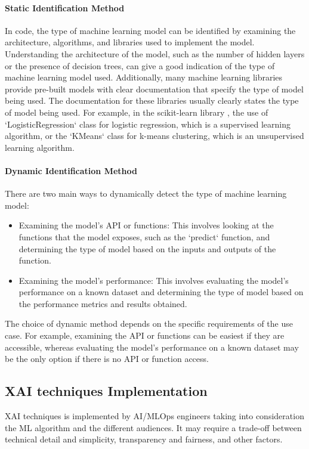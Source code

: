 \documentclass[conference]{IEEEtran}
\begin{document}
\paragraph{Static Identification Method} In code, the type of machine learning model can be identified by examining the architecture, algorithms, and libraries used to implement the model. Understanding the architecture of the model, such as the number of hidden layers or the presence of decision trees, can give a good indication of the type of machine learning model used. Additionally, many machine learning libraries provide pre-built models with clear documentation that specify the type of model being used. The documentation for these libraries usually clearly states the type of model being used. 
For example, in the scikit-learn library \cite{pedregosa2011scikit}, the use of `LogisticRegression` class for logistic regression, which is a supervised learning algorithm, or the `KMeans` class for k-means clustering, which is an unsupervised learning algorithm.
\paragraph{Dynamic Identification Method}There are two main ways to dynamically detect the type of machine learning model:

\begin{itemize}
	\item Examining the model's API or functions: This involves looking at the functions that the model exposes, such as the `predict` function, and determining the type of model based on the inputs and outputs of the function.

	\item Examining the model's performance: This involves evaluating the model's performance on a known dataset and determining the type of model based on the performance metrics and results obtained.
\end{itemize}

The choice of dynamic method depends on the specific requirements of the use case. For example, examining the API or functions can be easiest if they are accessible, whereas evaluating the model's performance on a known dataset may be the only option if there is no API or function access.

\subsection{XAI techniques Implementation}
XAI techniques is implemented by AI/MLOps engineers taking into consideration the ML algorithm and the different audiences. It may require a trade-off between technical detail and simplicity, transparency and fairness, and other factors.
\end{document}

